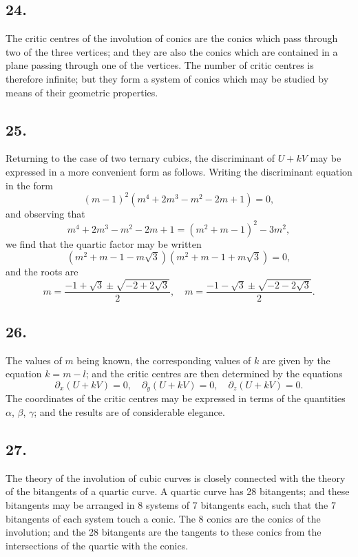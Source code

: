 \documentclass[11pt,a4paper]{article}
\theoremstyle{definition}
\begin{document}
\subsection*{24.}

The critic centres of the involution of conics are the conics which pass through two of
the three vertices; and they are also the conics which are contained in a plane passing
through one of the vertices. The number of critic centres is therefore infinite; but they
form a system of conics which may be studied by means of their geometric properties.

\newpage
\subsection*{25.}

Returning to the case of two ternary cubics, the discriminant of $U + kV$ may be
expressed in a more convenient form as follows. Writing the discriminant equation in
the form
\[
(m - 1)^{2}(m^{4} + 2m^{3} - m^{2} - 2m + 1) = 0,
\]
and observing that
\[
m^{4} + 2m^{3} - m^{2} - 2m + 1 = (m^{2} + m - 1)^{2} - 3m^{2},
\]
we find that the quartic factor may be written
\[
(m^{2} + m - 1 - m\sqrt{3})(m^{2} + m - 1 + m\sqrt{3}) = 0,
\]
and the roots are
\[
m = \frac{-1 + \sqrt{3} \pm \sqrt{-2 + 2\sqrt{3}}}{2},\quad
m = \frac{-1 - \sqrt{3} \pm \sqrt{-2 - 2\sqrt{3}}}{2}.
\]

\subsection*{26.}

The values of $m$ being known, the corresponding values of $k$ are given by the equation
$k = m - l$; and the critic centres are then determined by the equations
\[
\partial_{x}(U + kV) = 0,\quad \partial_{y}(U + kV) = 0,\quad \partial_{z}(U + kV) = 0.
\]
The coordinates of the critic centres may be expressed in terms of the quantities $\alpha$, $\beta$,
$\gamma$; and the results are of considerable elegance.

\newpage
\subsection*{27.}

The theory of the involution of cubic curves is closely connected with the theory of
the bitangents of a quartic curve. A quartic curve has 28 bitangents; and these bitangents
may be arranged in 8 systems of 7 bitangents each, such that the 7 bitangents of each
system touch a conic. The 8 conics are the conics of the involution; and the 28 bitangents
are the tangents to these conics from the intersections of the quartic with the conics.
\end{document}
